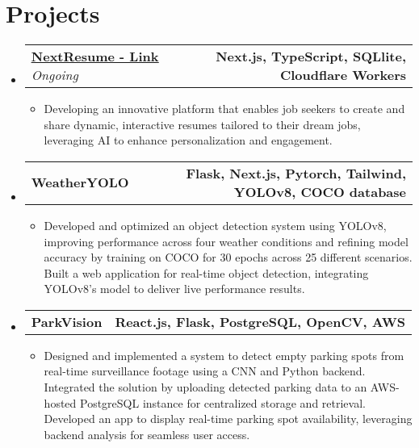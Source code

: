 \documentclass[letterpaper,11pt]{article}
\makeatletter
\newcommand{\resumeItem}[1]{
  \item\small{
    {#1 \vspace{-2pt}}
  }
}
\newcommand{\resumeProjectHeading}[2]{
    \item
    \begin{tabular*}{1.001\textwidth}{l@{\extracolsep{\fill}}r}
      \small#1 & \textbf{\small #2}\\
    \end{tabular*}\vspace{-7pt}
}
\newcommand{\resumeSubHeadingListStart}{\begin{itemize}[leftmargin=0.0in, label={}]}
\newcommand{\resumeSubHeadingListEnd}{\end{itemize}}
\newcommand{\resumeItemListStart}{\begin{itemize}}
\newcommand{\resumeItemListEnd}{\end{itemize}\vspace{-5pt}}
\makeatother
\begin{document}
\section{Projects}
\vspace{-6pt}
\resumeSubHeadingListStart
    \resumeProjectHeading
      {\href{https://nextresume.app/}{\underline{\textbf{NextResume - Link}}}  \emph{Ongoing}}{Next.js, TypeScript, SQLlite, Cloudflare Workers}
      \resumeItemListStart
        \resumeItem{Developing an innovative platform that enables job seekers to create and share dynamic, interactive resumes tailored to their dream jobs, leveraging AI to enhance personalization and engagement.}
      \resumeItemListEnd
    \vspace{-16pt}
    \resumeProjectHeading
        {\textbf{WeatherYOLO}  \emph{}}{Flask, Next.js, Pytorch, Tailwind, YOLOv8, COCO database}
        \resumeItemListStart
          \resumeItem{Developed and optimized an object detection system using YOLOv8, improving performance 
          across four weather conditions and refining model accuracy by training on COCO for 30 epochs across 25 different scenarios. Built a web application for real-time object detection, integrating YOLOv8’s model to deliver live performance results.}
        \resumeItemListEnd
        \vspace{-16pt}
    \resumeProjectHeading
        {\textbf{ParkVision}  \emph{}}{React.js, Flask, PostgreSQL, OpenCV, AWS}
        \resumeItemListStart
         \resumeItem{Designed and implemented a system to detect empty parking spots from real-time surveillance footage using a CNN and Python backend. Integrated the solution by uploading detected parking data to an AWS-hosted PostgreSQL 
         instance for centralized storage and retrieval. Developed an app to display real-time parking spot availability, leveraging backend analysis for seamless user access.}
        \resumeItemListEnd
  \resumeSubHeadingListEnd
\vspace{-15pt}
\end{document}
